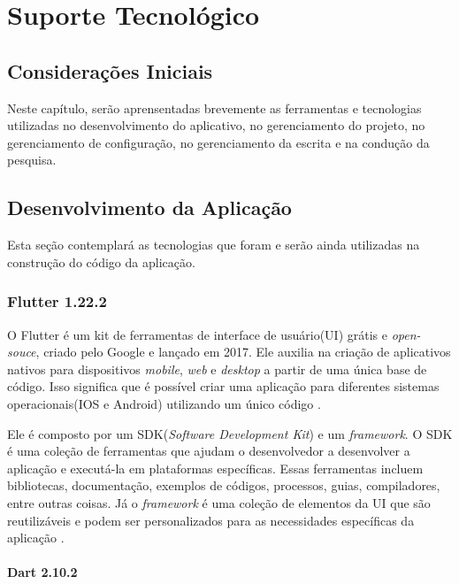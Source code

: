 \chapter[Suporte Tecnológico]{Suporte Tecnológico}

\section{Considerações Iniciais}
Neste capítulo, serão aprensentadas brevemente as ferramentas e tecnologias 
utilizadas no desenvolvimento do aplicativo, no gerenciamento 
do projeto, no gerenciamento de configuração, no gerenciamento da 
escrita e na condução da pesquisa.

\section{Desenvolvimento da Aplicação}

Esta seção contemplará as tecnologias que foram e serão ainda utilizadas na construção do 
código da aplicação.

\subsection{Flutter 1.22.2}

O Flutter \cite{flutter2017} é um kit de ferramentas de interface de usuário(UI) 
grátis e \emph{open-souce}, criado pelo Google e lançado em 2017. 
Ele auxilia na criação de aplicativos nativos para dispositivos 
\emph{mobile}, \emph{web} e \emph{desktop} a partir de uma 
única base de código. Isso significa que é possível criar uma 
aplicação para diferentes sistemas operacionais(IOS e Android) 
utilizando um único código \cite{flutter2017}.

Ele é composto por um SDK(\emph{Software Development Kit}) e um
\emph{framework}. O SDK é uma coleção de ferramentas que ajudam
o desenvolvedor a desenvolver a aplicação e executá-la em
plataformas específicas. Essas ferramentas incluem bibliotecas,
documentação, exemplos de códigos, processos, guias,
compiladores, entre outras coisas. Já o \emph{framework} é
uma coleção de elementos da UI que são reutilizáveis e podem
ser personalizados para as necessidades específicas da
aplicação \cite{flutter2017}.

\subsubsection{Dart 2.10.2}

